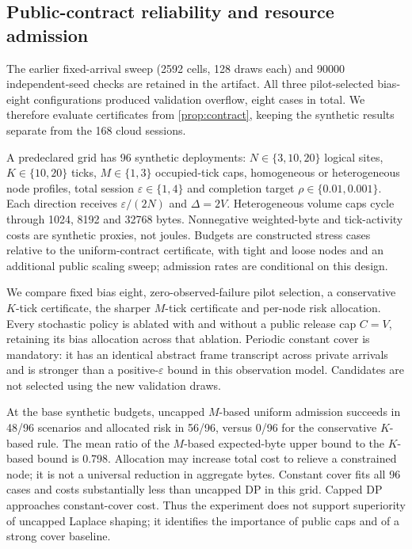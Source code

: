\subsection{Public-contract reliability and resource admission}\label{sec:stress}
The earlier fixed-arrival sweep (2592 cells, 128 draws each) and 90000 independent-seed checks are retained in the artifact. All three pilot-selected bias-eight configurations produced validation overflow, eight cases in total. We therefore evaluate certificates from \cref{prop:contract}, keeping the synthetic results separate from the 168 cloud sessions.

A predeclared grid has 96 synthetic deployments: $N\in\{3,10,20\}$ logical sites, $K\in\{10,20\}$ ticks, $M\in\{1,3\}$ occupied-tick caps, homogeneous or heterogeneous node profiles, total session $\varepsilon\in\{1,4\}$ and completion target $\rho\in\{0.01,0.001\}$. Each direction receives $\varepsilon/(2N)$ and $\Delta=2V$. Heterogeneous volume caps cycle through 1024, 8192 and 32768 bytes. Nonnegative weighted-byte and tick-activity costs are synthetic proxies, not joules. Budgets are constructed stress cases relative to the uniform-contract certificate, with tight and loose nodes and an additional public scaling sweep; admission rates are conditional on this design.

We compare fixed bias eight, zero-observed-failure pilot selection, a conservative $K$-tick certificate, the sharper $M$-tick certificate and per-node risk allocation. Every stochastic policy is ablated with and without a public release cap $C=V$, retaining its bias allocation across that ablation. Periodic constant cover is mandatory: it has an identical abstract frame transcript across private arrivals and is stronger than a positive-$\varepsilon$ bound in this observation model. Candidates are not selected using the new validation draws.

At the base synthetic budgets, uncapped $M$-based uniform admission succeeds in 48/96 scenarios and allocated risk in 56/96, versus 0/96 for the conservative $K$-based rule. The mean ratio of the $M$-based expected-byte upper bound to the $K$-based bound is 0.798. Allocation may increase total cost to relieve a constrained node; it is not a universal reduction in aggregate bytes. Constant cover fits all 96 cases and costs substantially less than uncapped DP in this grid. Capped DP approaches constant-cover cost. Thus the experiment does not support superiority of uncapped Laplace shaping; it identifies the importance of public caps and of a strong cover baseline.

